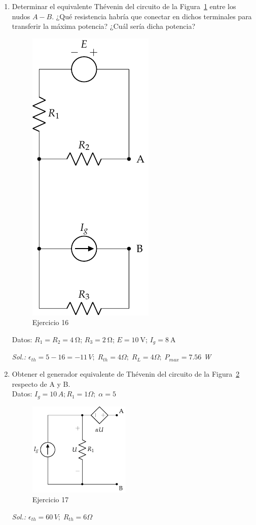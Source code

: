 \begin{enumerate}
  \item Determinar el equivalente Thévenin del circuito de la
    Figura~\ref{fig.ej17_BT1} entre los nudos $A-B$. ¿Qué resistencia
    habría que conectar en dichos terminales para transferir la máxima
    potencia? ¿Cuál sería dicha potencia?
    \begin{figure}[H]
      \centering \includegraphics{../figs/ej17_BT1.pdf}
      \caption{Ejercicio 16}
      \label{fig.ej17_BT1}
    \end{figure}

    Datos: $R_1 = R_2 = \qty{4}{\ohm}$; $R_3 = \qty{2}{\ohm}$; $E = \qty{10}{\volt}$; $I_g = \qty{8}{\ampere}$

    \emph{Sol.:
      $\epsilon_{th}=5-16=-11\,V;\; R_{th}=4\Omega;\;
      R_L=4\Omega;\;P_{max}=7.56$ W}


  \item Obtener el generador equivalente de Thévenin del circuito de la Figura~\ref{fig.ej18_BT1} respecto de A y B.\\
    Datos: $I_g=10\,A; R_1=1\Omega;\; \alpha=5$
    \begin{figure}[H]
      \centering \includegraphics[height=4.5cm]{../figs/Thevenin1.pdf}
      \caption{Ejercicio 17}
      \label{fig.ej18_BT1}
    \end{figure}
    \emph{Sol.: $\epsilon_{th}=60\,V;\;R_{th}=6\Omega$}


\end{enumerate}
